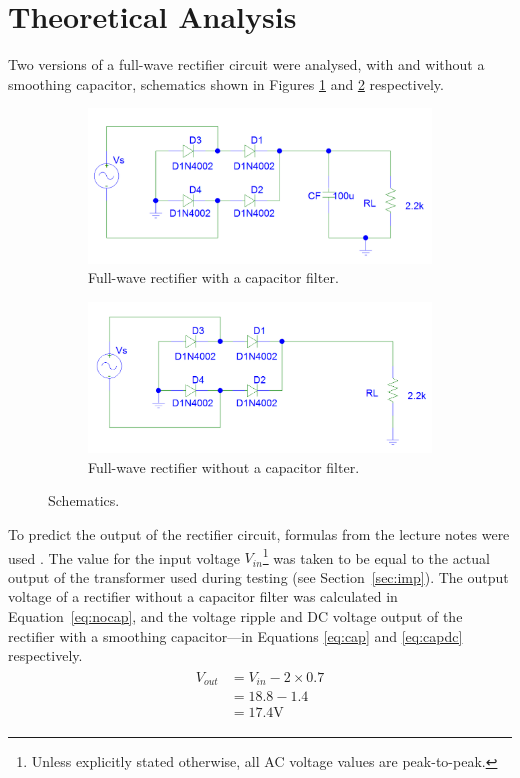\documentclass[12pt]{article}
\begin{document}
\section{Theoretical Analysis}
\label{sec:the}
Two versions of a full-wave rectifier circuit were analysed, with and without a smoothing capacitor, schematics shown in Figures \ref{fig:cap} and \ref {fig:nocap} respectively.
\begin{figure}[h!]
\centering
\begin{subfigure}[b]{0.45\textwidth}
\includegraphics[width=\textwidth]{rekt_cap}
\caption{Full-wave rectifier with a capacitor filter.}
\label{fig:cap}
\end{subfigure}
\qquad
\begin{subfigure}[b]{0.45\textwidth}
\includegraphics[width=\textwidth]{rekt_nocap}
\caption{Full-wave rectifier without a capacitor filter.}
\label{fig:nocap}
\end{subfigure}
\caption{Schematics.}
\label{fig:sch}
\end{figure}

To predict the output of the rectifier circuit, formulas from the lecture notes were used \citep{lecture}. The value for the input voltage $V_{in}$\footnote{Unless explicitly stated otherwise, all AC voltage values are peak-to-peak.} was taken to be equal to the actual output of the transformer used during testing (see Section~\ref{sec:imp}). The output voltage of a rectifier without a capacitor filter was calculated in Equation~\ref{eq:nocap}, and the voltage ripple and DC voltage output of the rectifier with a smoothing capacitor---in Equations \ref{eq:cap} and \ref{eq:capdc} respectively.
\begin{align}
\begin{split}
V_{out}&=V_{in}-2\times0.7\\
&=18.8-1.4\\
&=17.4\mathrm{V}
\label{eq:nocap}
\end{split}
\end{align}
\end{document}
